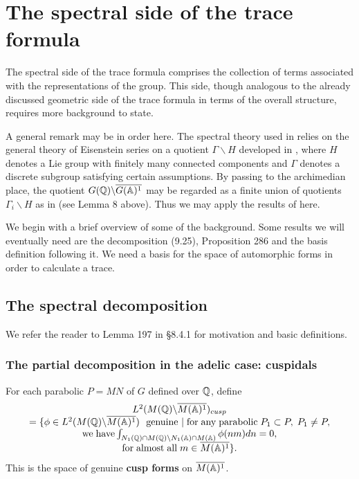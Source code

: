 \section{The spectral side of the trace formula}

The spectral side of the trace formula comprises the collection of terms
associated with the representations of the group. This side, though
analogous to the already discussed geometric side of the trace formula in
terms of the overall structure, requires more background to state.

A general remark may be in order here. The spectral theory used in
\cite{A2}
relies on the general theory of Eisenstein series on a quotient $\Gamma
\backslash H$ developed in \cite{L1},
where $H$ denotes a Lie group with finitely
many connected components and $\Gamma $ denotes a discrete subgroup
satisfying certain assumptions. By passing to the archimedian place, the
quotient $G({\Bbb{Q}})\backslash \overline{G({\Bbb{A}})^1}$
may be regarded as a
finite union of quotients $\Gamma _i\backslash H$ as in \cite{L1}
(see Lemma 8 above). Thus we may apply the results of \cite{L1} here.

We begin with a brief overview of some of the background. Some results we
will eventually need are the decomposition (9.25), Proposition 286
and the basis definition following it. 
We need a basis for the space of automorphic forms in order to
calculate a trace.

\subsection{The spectral decomposition}

We refer the reader to Lemma 197 in \S 8.4.1 for motivation
and basic definitions.

\subsubsection{The partial decomposition in the adelic case: cuspidals}

For each parabolic $P=MN$ of $G$ defined over ${\Bbb{Q}}$, define 
\begin{equation}
\begin{array}{c}
L^2(M({\Bbb{Q}})\backslash \overline{M({\Bbb{A}})^1})_{cusp} \\ 
=\{\phi \in L^2(M({{\Bbb{Q}}})\backslash \overline{M({\Bbb{A}})^1})
\ {\rm \ genuine\ }|\;{\rm for\;any\;parabolic}\;
P_1\subset P,\;P_1\neq P, \\ 
{\rm we\;have}
\int_{N_1({\Bbb{Q}})\cap M({\Bbb{Q}})\backslash
N_1({\Bbb{A}})\cap M({\Bbb{A}})}\phi (nm)dn=0, \\ 
{\rm for\;almost\;all}\;m\in \overline{M({\Bbb{A}})^1}\}.
\end{array}
\end{equation}
This is the space of genuine {\bf cusp forms} on
$\overline{M({\Bbb{A}})^1}$.

